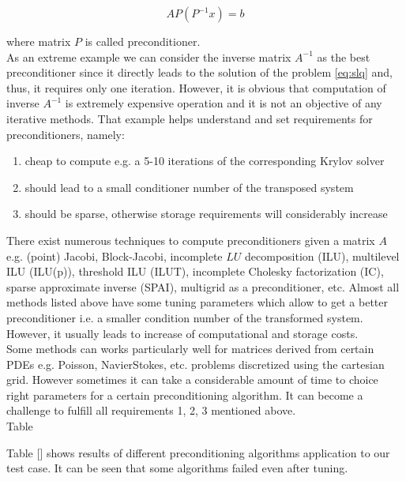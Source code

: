 \begin{equation} \label{eq:pcn-2}
	AP(P^{-1}x) = b
\end{equation}

where matrix $P$ is called preconditioner.\\


As an extreme example we can consider the inverse matrix $A^{-1}$ as the best preconditioner since it directly leads to the solution of the problem \ref{eq:slq} and, thus, it requires only one iteration. However, it is obvious that computation of inverse $A^{-1}$ is extremely expensive operation and it is not an objective of any iterative methods. That example helps understand and set requirements for preconditioners, namely:

\begin{enumerate}
	\item cheap to compute e.g. a 5-10 iterations of the corresponding Krylov solver
	\item should lead to a small conditioner number of the transposed system
	\item should be sparse, otherwise storage requirements will considerably increase
\end{enumerate}


There exist numerous techniques to compute preconditioners given a matrix $A$ e.g. (point) Jacobi, Block-Jacobi, incomplete $LU$ decomposition (ILU), multilevel ILU (ILU(p)), threshold ILU (ILUT), incomplete Cholesky factorization (IC), sparse approximate inverse (SPAI), multigrid as a preconditioner, etc. Almost all methods listed above have some tuning parameters which allow to get a better preconditioner i.e. a smaller condition number of the transformed system. However, it usually leads to increase of computational and storage costs. \\

Some methods can works particularly well for matrices derived from certain PDEs e.g. Poisson, Navier\-Stokes, etc. problems discretized using the cartesian grid. However sometimes it can take a considerable amount of time to choice right parameters for a certain preconditioning algorithm. It can become a challenge to fulfill all requirements 1, 2, 3 mentioned above. \\

Table 

Table [] shows results of different preconditioning algorithms application to our test case. It can be seen that some algorithms failed even after tuning. \\

